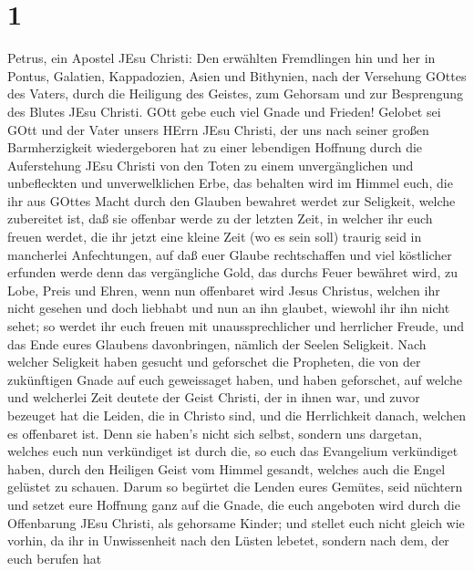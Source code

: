 \hypertarget{section}{%
\section{1}\label{section}}

 Petrus, ein Apostel JEsu Christi: Den erwählten Fremdlingen
hin und her in Pontus, Galatien, Kappadozien, Asien und Bithynien,
 nach der Versehung GOttes des Vaters, durch die Heiligung
des Geistes, zum Gehorsam und zur Besprengung des Blutes JEsu Christi.
GOtt gebe euch viel Gnade und Frieden!  Gelobet sei GOtt und
der Vater unsers HErrn JEsu Christi, der uns nach seiner großen
Barmherzigkeit wiedergeboren hat zu einer lebendigen Hoffnung durch die
Auferstehung JEsu Christi von den Toten  zu einem
unvergänglichen und unbefleckten und unverwelklichen Erbe, das behalten
wird im Himmel  euch, die ihr aus GOttes Macht durch den
Glauben bewahret werdet zur Seligkeit, welche zubereitet ist, daß sie
offenbar werde zu der letzten Zeit,  in welcher ihr euch
freuen werdet, die ihr jetzt eine kleine Zeit (wo es sein soll) traurig
seid in mancherlei Anfechtungen,  auf daß euer Glaube
rechtschaffen und viel köstlicher erfunden werde denn das vergängliche
Gold, das durchs Feuer bewähret wird, zu Lobe, Preis und Ehren, wenn nun
offenbaret wird Jesus Christus,  welchen ihr nicht gesehen
und doch liebhabt und nun an ihn glaubet, wiewohl ihr ihn nicht sehet;
so werdet ihr euch freuen mit unaussprechlicher und herrlicher Freude,
 und das Ende eures Glaubens davonbringen, nämlich der
Seelen Seligkeit.  Nach welcher Seligkeit haben gesucht und
geforschet die Propheten, die von der zukünftigen Gnade auf euch
geweissaget haben,  und haben geforschet, auf welche und
welcherlei Zeit deutete der Geist Christi, der in ihnen war, und zuvor
bezeuget hat die Leiden, die in Christo sind, und die Herrlichkeit
danach,  welchen es offenbaret ist. Denn sie haben's nicht
sich selbst, sondern uns dargetan, welches euch nun verkündiget ist
durch die, so euch das Evangelium verkündiget haben, durch den Heiligen
Geist vom Himmel gesandt, welches auch die Engel gelüstet zu schauen.
 Darum so begürtet die Lenden eures Gemütes, seid nüchtern
und setzet eure Hoffnung ganz auf die Gnade, die euch angeboten wird
durch die Offenbarung JEsu Christi,  als gehorsame Kinder;
und stellet euch nicht gleich wie vorhin, da ihr in Unwissenheit nach
den Lüsten lebetet,  sondern nach dem, der euch berufen hat
